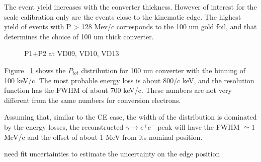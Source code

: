 The event yield increases with the converter thickness. However of interest for the scale calibration only
are the events close to the kinematic edge.
The highest yield of events with P > 128 Mev/c corresponds to the 100 um gold foil, and that determines
the choice of 100 um thick converter.

\begin{figure}[H]
  \caption{
    \label{figure:sum_mom_vd09_10_13}
    P1+P2 at VD09, VD10, VD13
  }
\end{figure}

Figure ~\ref{figure:sum_mom_vd09_10_13} shows the $P_{tot}$ distribution for 100 um converter
with the binning of 100 keV/c. The most probable energy loss is about 800/c keV, 
and the resolution function has the FWHM of about 700 keV/c.
These numbers are not very different from the same numbers for conversion electrons.

Assuming that, similar to the CE case, the width of the distribution is dominated by the energy losses,
the reconstructed $\gamma \to e^+e^-$ peak will have the FWHM $\simeq 1$ MeV/c and the offset
of about 1 MeV from its nominal position.

{\red need fit uncertainties to estimate the uncertainty on the edge position }

